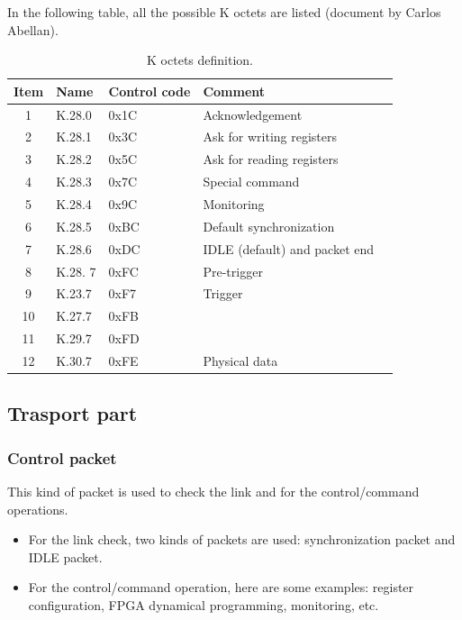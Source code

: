In the following table, all the possible K octets are listed (document by Carlos Abellan).

\begin{table} [!htbp]
  \centering
  \caption{K octets definition.}
\begin{tabular}{|c|p{4cm}|p{4cm}|p{4cm}|p{4cm}|}
\hline
\bf{Item}  			& 		\bf{Name}		& \bf{Control code}	& \bf{Comment}\\
\hline
1				&	K.28.0			&	0x1C			&	Acknowledgement\\
2				&	K.28.1			&	0x3C			&	Ask for writing registers\\
3				&	K.28.2			&	0x5C			&	Ask for reading registers\\
4				&	K.28.3			&	0x7C			&	Special command\\
5				&	K.28.4			&	0x9C			&	Monitoring\\
6				&	K.28.5			&	0xBC		& Default synchronization\\
7				&	K.28.6			&	0xDC		& IDLE (default) and packet end\\
8				&	K.28.	7			&	0xFC		&	Pre-trigger\\
9				&	K.23.7			&	0xF7			&	Trigger \\
10				&	K.27.7			&	0xFB			&	\\
11				&	K.29.7			&	0xFD			&	\\
12				&	K.30.7			&	0xFE			&	Physical data\\
\hline
\end{tabular}
\end{table}

\clearpage
\newpage

\subsection{Trasport part}

\subsubsection{Control packet\newline}

This kind of packet is used to check the link and for the control/command operations.
\begin{itemize}
\item For the link check, two kinds of packets are used: synchronization packet and IDLE packet.
\item For the control/command operation, here are some examples: register configuration,  FPGA dynamical programming, monitoring, etc.\newline
\end{itemize}

